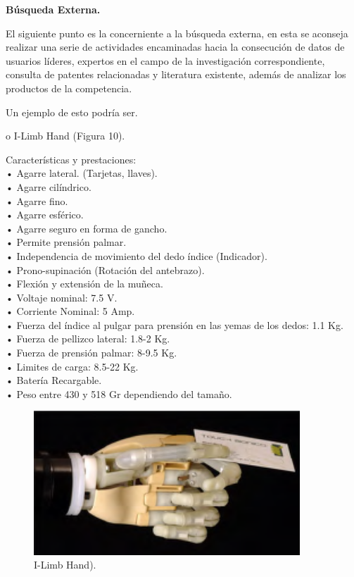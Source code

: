 \documentclass{article}
\begin{document}
\textbf{Búsqueda Externa.} 


El siguiente punto es la concerniente a la búsqueda externa, en esta se aconseja realizar una serie de actividades encaminadas hacia la consecución de datos de usuarios líderes, expertos en el campo de la investigación correspondiente, consulta de patentes relacionadas y literatura existente, además de analizar los productos de la competencia\cite{ff5}.


Un ejemplo de esto podría ser.


o	I-Limb Hand (Figura 10). 

Características y prestaciones:
\\•	Agarre lateral. (Tarjetas, llaves).
\\•	Agarre cilíndrico.
\\•	Agarre fino.
\\•	Agarre esférico.
\\•	Agarre seguro en forma de gancho.
\\•	Permite prensión palmar.
\\•	Independencia de movimiento del dedo índice (Indicador).
\\•	Prono-supinación (Rotación del antebrazo).
\\•	Flexión y extensión de la muñeca.
\\•	Voltaje nominal: 7.5 V.
\\•	Corriente Nominal: 5 Amp.
\\•	Fuerza del índice al pulgar para prensión en las yemas de los dedos: 1.1 Kg.
\\•	Fuerza de pellizco lateral: 1.8-2 Kg.
\\•	Fuerza de prensión palmar: 8-9.5 Kg.
\\•	Limites de carga: 8.5-22 Kg.
\\•	Batería Recargable.
\\•	Peso entre 430 y 518 Gr dependiendo del tamaño\cite{ff5}.

\begin{figure}[H] %
    \centering
    \includegraphics[width=100mm]{I-Limb Hand.png} %
    \caption{I-Limb Hand)\cite{ff5}.}
    \label{grafica:diez}
\end{figure}
\end{document}
